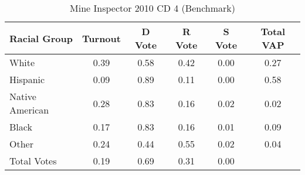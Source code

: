 \begin{table}[htb]
\begin{center}
\caption{Mine Inspector 2010 CD 4 (Benchmark)}
\label{smine_vap_cd_4_benchmark}
\begin{tabular}{lccccc}
  \hline
Racial Group & Turnout & D Vote & R Vote & S Vote & Total VAP \\ 
  \hline
White & 0.39 & 0.58 & 0.42 & 0.00 & 0.27 \\ 
  Hispanic & 0.09 & 0.89 & 0.11 & 0.00 & 0.58 \\ 
  Native American & 0.28 & 0.83 & 0.16 & 0.02 & 0.02 \\ 
  Black & 0.17 & 0.83 & 0.16 & 0.01 & 0.09 \\ 
  Other & 0.24 & 0.44 & 0.55 & 0.02 & 0.04 \\ 
  Total Votes & 0.19 & 0.69 & 0.31 & 0.00 &  \\ 
   \hline
\end{tabular}
\end{center}
\end{table}

